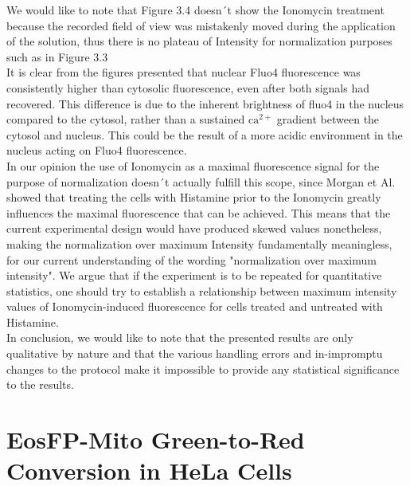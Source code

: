\documentclass[a4paper,english,12pt,bibliography=totoc]{scrreprt}
\begin{document}
We would like to note that Figure 3.4 doesn´t show the Ionomycin treatment because the recorded field of view was mistakenly moved during the application of the solution, thus there is no plateau of Intensity for normalization purposes such as in Figure 3.3\\

It is clear from the figures presented that nuclear Fluo4 fluorescence was consistently higher than cytosolic fluorescence, even after both signals had recovered. This difference is due to the inherent brightness of fluo4 in the nucleus compared to the cytosol, rather than a sustained $\mathrm{ca^{2+}}$ gradient between the cytosol and nucleus\cite{bootman_update_2009}. This could be the result of a more acidic environment in the nucleus acting on Fluo4 fluorescence. \\

In our opinion the use of Ionomycin as a maximal fluorescence signal for the purpose of normalization doesn´t actually fulfill this scope, since Morgan et Al. \cite{morgan_ionomycin_1994} showed that treating the cells with Histamine prior to the Ionomycin greatly influences the maximal fluorescence that can be achieved.
This means that the current experimental design would have produced skewed values nonetheless, making the normalization over maximum Intensity fundamentally meaningless, for our current understanding of the wording "normalization over maximum intensity". We argue that if the experiment is to be repeated for quantitative statistics, one should try to establish a relationship between maximum intensity values of Ionomycin-induced fluorescence for cells treated and untreated with Histamine.\\


In conclusion, we would like to note that the presented results are only qualitative by nature and that the various handling errors and in-impromptu changes to the protocol make it impossible to provide any statistical significance to the results.\\


\chapter{EosFP-Mito Green-to-Red Conversion in HeLa Cells}
\label{cha:experiment3}
\end{document}
